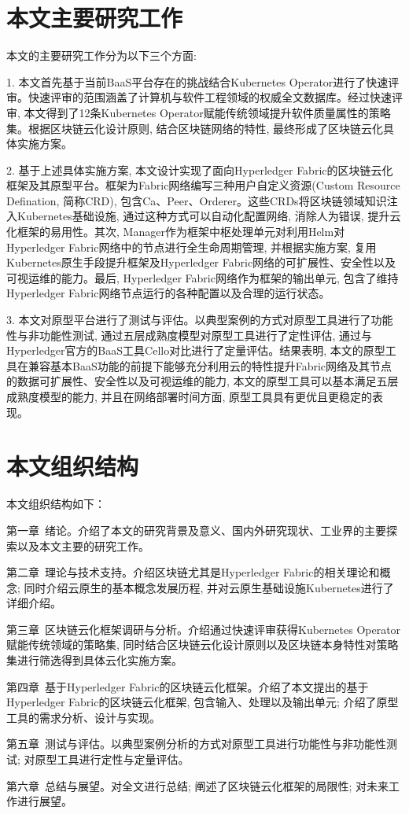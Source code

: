 \section{本文主要研究工作}

本文的主要研究工作分为以下三个方面: 

1. 本文首先基于当前BaaS平台存在的挑战结合Kubernetes Operator进行了快速评审。快速评审的范围涵盖了计算机与软件工程领域的权威全文数据库。经过快速评审, 本文得到了12条Kubernetes Operator赋能传统领域提升软件质量属性的策略集。根据区块链云化设计原则, 结合区块链网络的特性, 最终形成了区块链云化具体实施方案。

2. 基于上述具体实施方案, 本文设计实现了面向Hyperledger Fabric的区块链云化框架及其原型平台。框架为Fabric网络编写三种用户自定义资源(Custom Resource Defination, 简称CRD), 包含Ca、Peer、Orderer。这些CRDs将区块链领域知识注入Kubernetes基础设施, 通过这种方式可以自动化配置网络, 消除人为错误, 提升云化框架的易用性。其次, Manager作为框架中枢处理单元对利用Helm对Hyperledger Fabric网络中的节点进行全生命周期管理, 并根据实施方案, 复用Kubernetes原生手段提升框架及Hyperledger Fabric网络的可扩展性、安全性以及可视运维的能力。最后, Hyperledger Fabric网络作为框架的输出单元, 包含了维持Hyperledger Fabric网络节点运行的各种配置以及合理的运行状态。

3. 本文对原型平台进行了测试与评估。以典型案例的方式对原型工具进行了功能性与非功能性测试, 通过五层成熟度模型对原型工具进行了定性评估, 通过与Hyperledger官方的BaaS工具Cello对比进行了定量评估。结果表明, 本文的原型工具在兼容基本BaaS功能的前提下能够充分利用云的特性提升Fabric网络及其节点的数据可扩展性、安全性以及可视运维的能力, 本文的原型工具可以基本满足五层成熟度模型的能力, 并且在网络部署时间方面, 原型工具具有更优且更稳定的表现。


\section{本文组织结构}

本文组织结构如下：

第一章~绪论。介绍了本文的研究背景及意义、国内外研究现状、工业界的主要探索以及本文主要的研究工作。

第二章~理论与技术支持。介绍区块链尤其是Hyperledger Fabric的相关理论和概念; 同时介绍云原生的基本概念发展历程, 并对云原生基础设施Kubernetes进行了详细介绍。

第三章~区块链云化框架调研与分析。介绍通过快速评审获得Kubernetes Operator赋能传统领域的策略集, 同时结合区块链云化设计原则以及区块链本身特性对策略集进行筛选得到具体云化实施方案。

第四章~基于Hyperledger Fabric的区块链云化框架。介绍了本文提出的基于Hyperledger Fabric的区块链云化框架, 包含输入、处理以及输出单元; 介绍了原型工具的需求分析、设计与实现。

第五章~测试与评估。以典型案例分析的方式对原型工具进行功能性与非功能性测试; 对原型工具进行定性与定量评估。

第六章~总结与展望。对全文进行总结; 阐述了区块链云化框架的局限性; 对未来工作进行展望。


